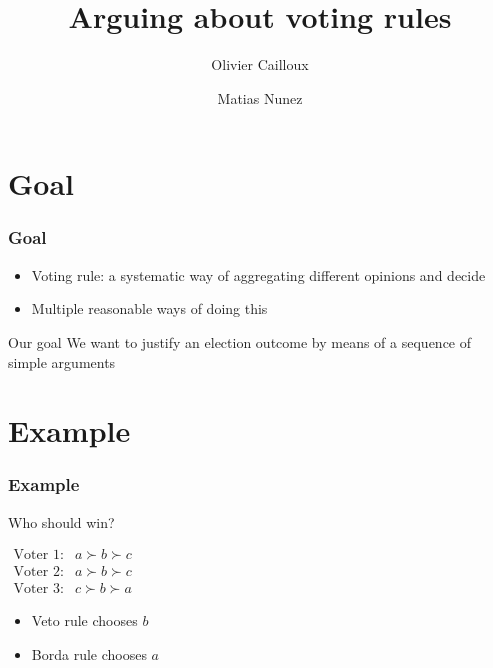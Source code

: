 \documentclass[english]{beamer}
\title{Arguing about voting rules}
\author[Olivier Cailloux]{Olivier Cailloux \and Matias Nunez}
\date{\formatdate{1}{12}{2016}}
\begin{document}


\begin{frame}[plain]
   \titlepage
\end{frame}
\addtocounter{framenumber}{-1}

\section{Goal}
\begin{frame}
	\frametitle{Goal}
	
	\begin{itemize}
		\item Voting rule: a systematic way of aggregating different opinions and decide
		\item Multiple reasonable ways of doing this
	\end{itemize}
	\begin{block}{Our goal}
		We want to justify an election outcome by means of a sequence of simple arguments
	\end{block}
\end{frame}

\section{Example}
\begin{frame}
	\frametitle{Example}
	
	\begin{block}{Who should win?}
		\begin{center}
			$\begin{array}{lc}
				\text{Voter 1:} & a\succ b\succ c \\
				\text{Voter 2:} & a\succ b\succ c \\
				\text{Voter 3:} & c\succ b\succ a 
			\end{array}$
		\end{center}
	\end{block}
	\begin{itemize}
		\item Veto rule chooses $b$
		\item Borda rule chooses $a$
	\end{itemize}
\end{frame}
\end{document}
